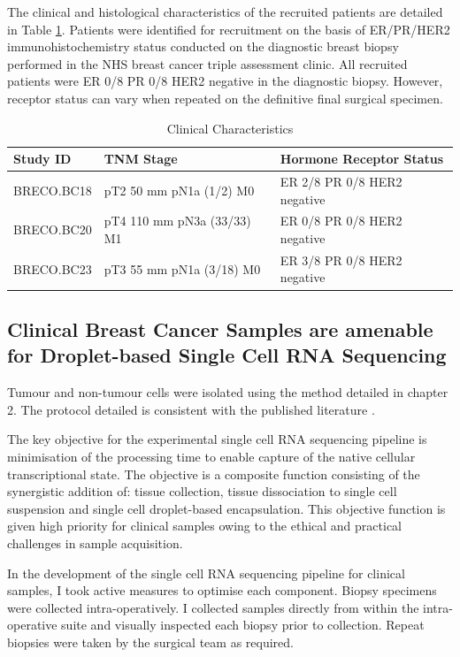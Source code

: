 The clinical and histological characteristics of the recruited patients are detailed in Table \ref{tab: clinical_characteristics}. Patients were identified for recruitment on the basis of ER/PR/HER2 immunohistochemistry status conducted on the diagnostic breast biopsy performed in the NHS breast cancer triple assessment clinic. All recruited patients were ER 0/8 PR 0/8 HER2 negative in the diagnostic biopsy. However, receptor status can vary when repeated on the definitive final surgical specimen.

\begin{table}[h]
	\centering
	\begin{tabular}{l | l | l}
		Study ID & TNM Stage & Hormone Receptor Status \\
		\hline
		BRECO.BC18 & pT2 50 mm pN1a (1/2) M0 & ER 2/8 PR 0/8 HER2 negative \\
		BRECO.BC20 & pT4 110 mm pN3a (33/33) M1 & ER 0/8 PR 0/8 HER2 negative \\
		BRECO.BC23 & pT3 55 mm pN1a (3/18) M0 & ER 3/8 PR 0/8 HER2 negative
	\end{tabular}
	\caption{Clinical Characteristics}
	\label{tab: clinical_characteristics}
\end{table}

\subsection{Clinical Breast Cancer Samples are amenable for Droplet-based Single Cell RNA Sequencing}
Tumour and non-tumour cells were isolated using the method detailed in chapter 2. The protocol detailed is consistent with the published literature \cite{Bassez2021}.

The key objective for the experimental single cell RNA sequencing pipeline is minimisation of the processing time to enable capture of the native cellular transcriptional state. The objective is a composite function consisting of the synergistic addition of: tissue collection, tissue dissociation to single cell suspension and single cell droplet-based encapsulation. This objective function is given high priority for clinical samples owing to the ethical and practical challenges in sample acquisition.

In the development of the single cell RNA sequencing pipeline for clinical samples, I took active measures to optimise each component. Biopsy specimens were collected intra-operatively. I collected samples directly from within the intra-operative suite and visually inspected each biopsy prior to collection. Repeat biopsies were taken by the surgical team as required.

